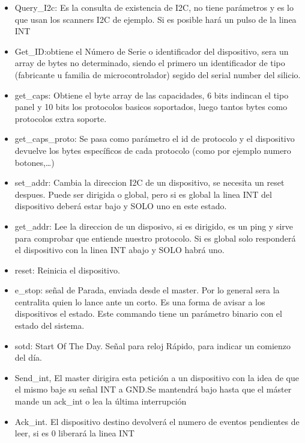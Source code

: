 \begin{itemize}
      \item{} Query\_I2c: Es la consulta de existencia de I2C, no tiene parámetros y es lo que usan los scanners I2C
            de ejemplo. Si es posible hará un pulso de la linea INT
      \item{} Get\_ID:\@ obtiene el Número de Serie o identificador del dispositivo, sera un array de bytes
            no determinado, siendo el primero un identificador de tipo (fabricante u familia de microcontrolador)
            segido del serial number del silicio.
      \item{} get\_caps: Obtiene el byte array de las capacidades, 6 bits indincan el tipo panel y 10 bits los
            protocolos basicos soportados, luego tantos bytes como protocolos extra soporte.
      \item{} get\_caps\_proto: Se pasa como parámetro el id de protocolo y el dispositivo devuelve los bytes
            específicos de cada protocolo (como por ejemplo numero botones,…)
      \item{} set\_addr: Cambia la direccion I2C de un dispositivo, se necesita un reset despues. Puede ser dirigida
            o global, pero si es global la linea INT del dispositivo deberá estar bajo y SOLO uno en este estado.
      \item{} get\_addr: Lee la direccion de un disposivo, si es dirigido, es un ping y sirve para comprobar
            que entiende nuestro protocolo. Si es global solo responderá el dispositivo con la linea INT abajo y SOLO
            habrá uno.
      \item{} reset: Reinicia el dispositivo.
      \item{} e\_stop: señal de Parada, enviada desde el master. Por lo general sera la centralita quien lo lance
            ante un corto. Es una forma de avisar a los dispositivos el estado. Este commando tiene un parámetro binario
            con el estado del sistema.
      \item{} sotd: Start Of The Day. Señal para reloj Rápido, para indicar un comienzo del día.
      \item{} Send\_int, El master dirigira esta petición a un dispositivo con la idea de que el mismo baje su señal
            INT a GND.\@ Se mantendrá bajo hasta que el máster mande un ack\_int o lea la última interrupción
      \item{} Ack\_int. El dispositivo destino devolverá el numero de eventos pendientes de leer, si es 0 liberará
            la linea INT

\end{itemize}
